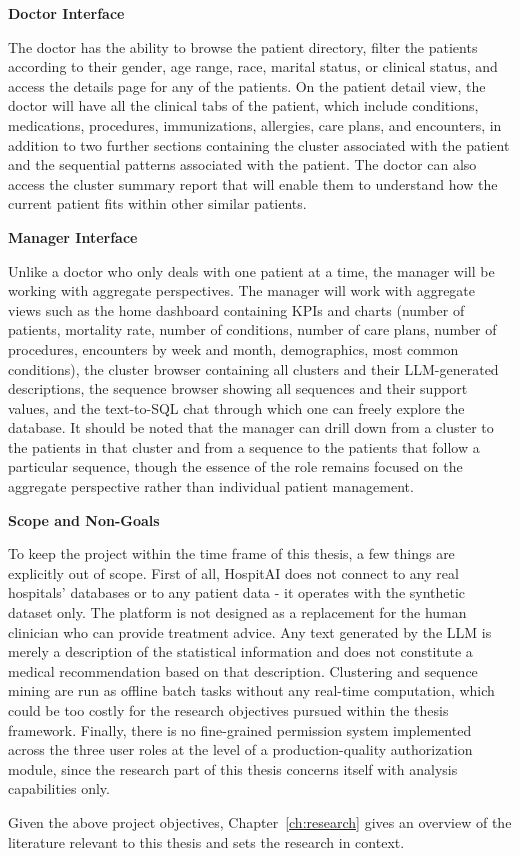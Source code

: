 \vspace{0.5em}
\noindent\textbf{Doctor Interface}

The doctor has the ability to browse the patient directory, filter the patients according to their gender, age range, race, marital status, or clinical status, and access the details page for any of the patients. On the patient detail view, the doctor will have all the clinical tabs of the patient, which include conditions, medications, procedures, immunizations, allergies, care plans, and encounters, in addition to two further sections containing the cluster associated with the patient and the sequential patterns associated with the patient. The doctor can also access the cluster summary report that will enable them to understand how the current patient fits within other similar patients.

\vspace{0.5em}
\noindent\textbf{Manager Interface}

Unlike a doctor who only deals with one patient at a time, the manager will be working with aggregate perspectives. The manager will work with aggregate views such as the home dashboard containing KPIs and charts (number of patients, mortality rate, number of conditions, number of care plans, number of procedures, encounters by week and month, demographics, most common conditions), the cluster browser containing all clusters and their LLM-generated descriptions, the sequence browser showing all sequences and their support values, and the text-to-SQL chat through which one can freely explore the database. It should be noted that the manager can drill down from a cluster to the patients in that cluster and from a sequence to the patients that follow a particular sequence, though the essence of the role remains focused on the aggregate perspective rather than individual patient management.

\vspace{0.5em}
\noindent\textbf{Scope and Non-Goals}

To keep the project within the time frame of this thesis, a few things are explicitly out of scope. First of all, HospitAI does not connect to any real hospitals' databases or to any patient data - it operates with the synthetic dataset only. The platform is not designed as a replacement for the human clinician who can provide treatment advice. Any text generated by the LLM is merely a description of the statistical information and does not constitute a medical recommendation based on that description. Clustering and sequence mining are run as offline batch tasks without any real-time computation, which could be too costly for the research objectives pursued within the thesis framework. Finally, there is no fine-grained permission system implemented across the three user roles at the level of a production-quality authorization module, since the research part of this thesis concerns itself with analysis capabilities only.

Given the above project objectives, Chapter~\ref{ch:research} gives an overview of the literature relevant to this thesis and sets the research in context.
